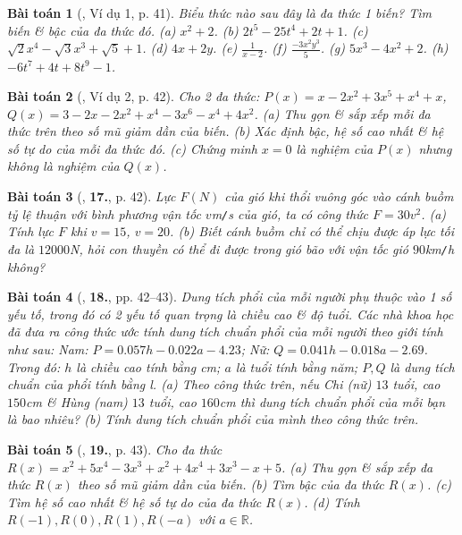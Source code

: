 \documentclass{article}
\numberwithin{equation}{section}
\newtheorem{baitoan}{Bài toán}
\begin{document}
\begin{baitoan}[\cite{SBT_Toan_7_Canh_Dieu_tap_2}, Ví dụ 1, p. 41]
	Biểu thức nào sau đây là đa thức 1 biến? Tìm biến \& bậc của đa thức đó. (a) $x^2 + 2$. (b) $2t^5 - 25t^4 + 2t + 1$. (c) $\sqrt{2}x^4 - \sqrt{3}x^3 + \sqrt{5} + 1$. (d) $4x + 2y$. (e) $\frac{1}{x - 2}$. (f) $\frac{-3x^2y^3}{5}$. (g) $5x^3 - 4x^2 + 2$. (h) $-6t^7 + 4t + 8t^9 - 1$.
\end{baitoan}

\begin{baitoan}[\cite{SBT_Toan_7_Canh_Dieu_tap_2}, Ví dụ 2, p. 42]
	Cho 2 đa thức: $P(x) = x - 2x^2 + 3x^5 + x^4 + x$, $Q(x) = 3 - 2x - 2x^2 + x^4 - 3x^6 - x^4 + 4x^2$. (a) Thu gọn \& sắp xếp mỗi đa thức trên theo số mũ giảm dần của biến. (b) Xác định bậc, hệ số cao nhất \& hệ số tự do của mỗi đa thức đó. (c) Chứng minh $x = 0$ là nghiệm của $P(x)$ nhưng không là nghiệm của $Q(x)$.
\end{baitoan}

\begin{baitoan}[\cite{SBT_Toan_7_Canh_Dieu_tap_2}, \textbf{17.}, p. 42]
	Lực $F(N)$ của gió khi thổi vuông góc vào cánh buồm tỷ lệ thuận với bình phương vận tốc $v$\emph{m\texttt{/}s} của gió, ta có công thức $F = 30v^2$. (a) Tính lực $F$ khi $v = 15$, $v = 20$. (b) Biết cánh buồm chỉ có thể chịu được áp lực tối đa là $12000$\emph{N}, hỏi con thuyền có thể đi được trong gió bão với vận tốc gió $90$\emph{km\texttt{/}h} không?
\end{baitoan}

\begin{baitoan}[\cite{SBT_Toan_7_Canh_Dieu_tap_2}, \textbf{18.}, pp. 42--43]
	Dung tích phổi của mỗi người phụ thuộc vào 1 số yếu tố, trong đó có 2 yếu tố quan trọng là chiều cao \& độ tuổi. Các nhà khoa học đã đưa ra công thức ước tính dung tích chuẩn phổi của mỗi người theo giới tính như sau: Nam: $P = 0.057h - 0.022a - 4.23$; Nữ: $Q = 0.041h - 0.018a - 2.69$. Trong đó: $h$ là chiều cao tính bằng \emph{cm}; $a$ là tuổi tính bằng năm; $P,Q$ là dung tích chuẩn của phổi tính bằng \emph{l}. (a) Theo công thức trên, nếu Chi (nữ) $13$ tuổi, cao $150$\emph{cm} \& Hùng (nam) $13$ tuổi, cao $160$\emph{cm} thì dung tích chuẩn phổi của mỗi bạn là bao nhiêu? (b) Tính dung tích chuẩn phổi của mình theo công thức trên.
\end{baitoan}

\begin{baitoan}[\cite{SBT_Toan_7_Canh_Dieu_tap_2}, \textbf{19.}, p. 43]
	Cho đa thức $R(x) = x^2 + 5x^4 - 3x^3 + x^2 + 4x^4 + 3x^3 - x + 5$. (a) Thu gọn \& sắp xếp đa thức $R(x)$ theo số mũ giảm dần của biến. (b) Tìm bậc của đa thức $R(x)$. (c) Tìm hệ số cao nhất \& hệ số tự do của đa thức $R(x)$. (d) Tính $R(-1),R(0),R(1),R(-a)$ với $a\in\mathbb{R}$.
\end{baitoan}
\end{document}
